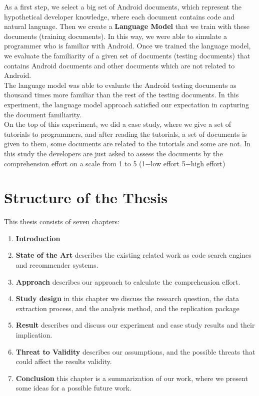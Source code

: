 \documentclass[12pt,mscthesis]{usiinfthesis}
\begin{document}
	 As a first step, we select a big set of Android documents, which represent the hypothetical developer knowledge, where each document contains code and natural language. Then we create a \textbf{ Language Model} that we train with these documents (training documents). In this way, we were able to simulate a programmer who is familiar with Android. Once we trained the language model, we evaluate the familiarity of a given set of documents (testing documents) that contains Android documents and other documents which are not related to Android.\\ 
	 The language model was able to evaluate the Android testing documents as thousand times more familiar than the rest of the testing documents.
	 In this experiment, the language model approach satisfied our expectation in capturing the document familiarity.\\

	 On the top of this experiment, we did a case study, where we give a set of tutorials to programmers, and after reading the tutorials, a set of documents is given to them, some documents are related to the tutorials and some are not. In this study the developers are just asked to assess the documents by the comprehension effort on a scale from 1 to 5 (1$-$low effort 5$-$high effort)
	 \newpage

	\section{Structure of the Thesis}
	This thesis consists of seven chapters: 
	\begin{enumerate}
	
		\item \textbf{Introduction}
		\item \textbf{State of the Art} describes the existing related work as code search engines and recommender systems.
		\item \textbf{Approach} describes our approach to calculate the comprehension effort.
		\item \textbf{Study design} in this chapter we discuss the research question, the data extraction process, and the analysis method, and the replication package 
		\item \textbf{Result} describes and discuss our experiment and case study results and their implication.
		\item \textbf{Threat to Validity} describes our assumptions, and the possible threats that could affect the results validity.
		\item \textbf{Conclusion} this chapter is a summarization of our work, where we present some ideas for a possible future work.
	\end{enumerate}
\end{document}
